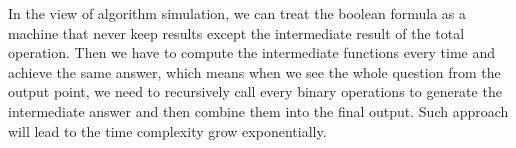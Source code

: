 \documentclass[11pt]{article}
\begin{document}
In the view of algorithm simulation, we can treat the boolean formula as a machine that never keep results except the intermediate result of the total operation. Then we have to compute the intermediate functions every time and achieve the same answer, which means when we see the whole question from the output point, we need to recursively call every binary operations to generate the intermediate answer and then combine them into the final output. Such approach will lead to the time complexity grow exponentially.
\end{document}
